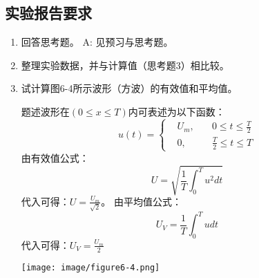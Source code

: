 \documentclass[UTF8]{article}
\begin{document}
        \subsection{实验报告要求}
            \begin{enumerate}[label=\textbf{\arabic*}.]
                \item 回答思考题。\newline
                A: 见预习与思考题。
                \item 整理实验数据，并与计算值（思考题3）相比较。 
                \item 试计算图6-4所示波形（方波）的有效值和平均值。
                \begin{adjustwidth}{0em}{0em}
                    \begin{minipage}[H]{0.45\textwidth}
                        \raggedright
                        \noindent\hspace{2em}题述波形在$\left( 0 \leq x \leq T\right)$内可表述为以下函数：
                        \begin{equation*}
                            u(t) = \left\{
                            \begin{aligned}
                                &U_m, &\quad 0 \leq t \leq \frac{T}{2} \\
                                &0, &\quad \frac{T}{2} \leq t \leq T
                            \end{aligned}
                            \right.
                        \end{equation*}
                        由有效值公式：
                        \begin{equation*}
                            U = \sqrt{\frac{1}{T}\int_{0}^{T}u^{2} dt}
                        \end{equation*}
                        代入可得：$U = \frac{U_m}{\sqrt{2}}$。
                        由平均值公式：
                        \begin{equation*}
                            U_{V} = \frac{1}{T}\int_{0}^{T} udt
                        \end{equation*}
                        代入可得：$U_{V} = \frac{U_m}{2}$
                    \end{minipage}
                    \hfill
                    \begin{minipage}[H]{0.45\textwidth}
                        \centering
                        \texttt{[image: image/figure6-4.png]}
                    \end{minipage}
                \end{adjustwidth}
            \end{enumerate}
\end{document}
